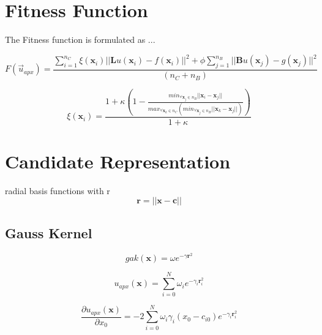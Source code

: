 \documentclass[./\jobname.tex]{subfiles}
\begin{document}
\section{Fitness Function}
\label{chap:fit_func}
The Fitness function is formulated as ... 

\begin{equation}
\label{eq:fit_func}
F(\vec{u}_{apx}) = \frac{\sum_{i=1}^{n_C} \xi (\mathbf{x}_i) || \mathbf{L}u(\mathbf{x}_i) - f(\mathbf{x}_i)||^2 + \phi \sum_{j=1}^{n_B} || \mathbf{B}u(\mathbf{x}_j) - g(\mathbf{x}_j)||^2}{(n_C + n_B)}  
\end{equation}

\begin{equation}
\label{eq:nc_weight}
\xi(\mathbf{x}_i) = \frac{1 + \kappa \left(1 - \frac{min_{\forall \mathbf{x}_j\in n_B}|| \mathbf{x}_i - \mathbf{x}_j ||}{max_{\forall\mathbf{x}_k \in n_C}(min_{\forall \mathbf{x}_j \in n_B} || \mathbf{x}_k - \mathbf{x}_j ||)}\right)}{1 + \kappa}
\end{equation}


\section{Candidate Representation}
\label{chap:candidate_rep}

radial basis functions with r
\begin{equation}
\label{eq: radius}
\mathbf{r} = \left|\left|\mathbf{x} - \mathbf{c} \right|\right|
\end{equation}

\subsection{Gauss Kernel}
\label{chap:gauss_kernel}

\begin{equation}
\label{eq:gauss_kernel}
gak(\mathbf{x}) = \omega e^{-\gamma \mathbf{r}^2}
\end{equation}

\begin{equation}
\label{eq:uapx_gauss_kernel}
u_{apx}(\mathbf{x}) = \sum_{i=0}^{N} \omega_i e^{-\gamma_i \mathbf{r}_i^2}
\end{equation}

\begin{equation}
\label{eq:uapx_gauss_kernel_x0}
\frac{\partial u_{apx}(\mathbf{x})}{\partial x_0} = -2 \sum_{i=0}^{N} \omega_i \gamma_i (x_0 - c_{i0}) e^{-\gamma_i \mathbf{r}_i^2}
\end{equation}
\end{document}
